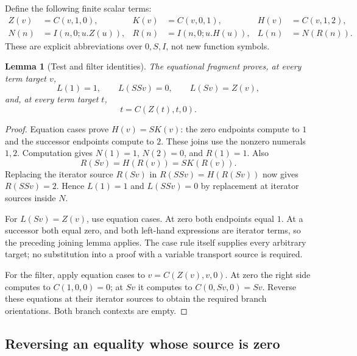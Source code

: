 \documentclass[11pt,letterpaper]{article}
\newtheorem{lemma}[theorem]{Lemma}
\theoremstyle{definition}
\begin{document}
Define the following finite scalar terms:
\[
\begin{aligned}
 Z(v)&=C(v,1,0),& K(v)&=C(v,0,1),& H(v)&=C(v,1,2),\\
 N(n)&=I(n,0;u.Z(u)),& R(n)&=I(n,0;u.H(u)),& L(n)&=N(R(n)).
\end{aligned}
\]
These are explicit abbreviations over $0,S,I$, not new function symbols.

\begin{lemma}[Test and filter identities]
The equational fragment proves, at every term target $v$,
\[
 L(1)=1,\qquad L(SSv)=0,\qquad L(Sv)=Z(v),
 \tag{T}\label{eq:tests}
\]
and, at every term target $t$,
\[
 t=C(Z(t),t,0).
 \tag{F}\label{eq:filter}
\]
\end{lemma}
\begin{proof}
Equation cases prove $H(v)=S K(v)$: the zero endpoints compute to $1$
and the successor endpoints compute to $2$. These joins use the nonzero
numerals $1,2$. Computation gives $N(1)=1$, $N(2)=0$, and $R(1)=1$.
Also
\[
 R(Sv)=H(R(v))=S K(R(v)).
\]
Replacing the iterator source $R(Sv)$ in $R(SSv)=H(R(Sv))$ now gives
$R(SSv)=2$. Hence $L(1)=1$ and $L(SSv)=0$ by replacement at iterator
sources inside $N$.

For $L(Sv)=Z(v)$, use equation cases. At zero both endpoints equal $1$.
At a successor both equal zero, and both left-hand expressions are
iterator terms, so the preceding joining lemma applies. The case rule
itself supplies every arbitrary target; no substitution into a proof with
a variable transport source is required.

For the filter, apply equation cases to $v=C(Z(v),v,0)$. At zero the
right side computes to $C(1,0,0)=0$; at $Sv$ it computes to
$C(0,Sv,0)=Sv$. Reverse these equations at their iterator sources to
obtain the required branch orientations. Both branch contexts are empty.
\end{proof}

\subsection{Reversing an equality whose source is zero}
\end{document}
